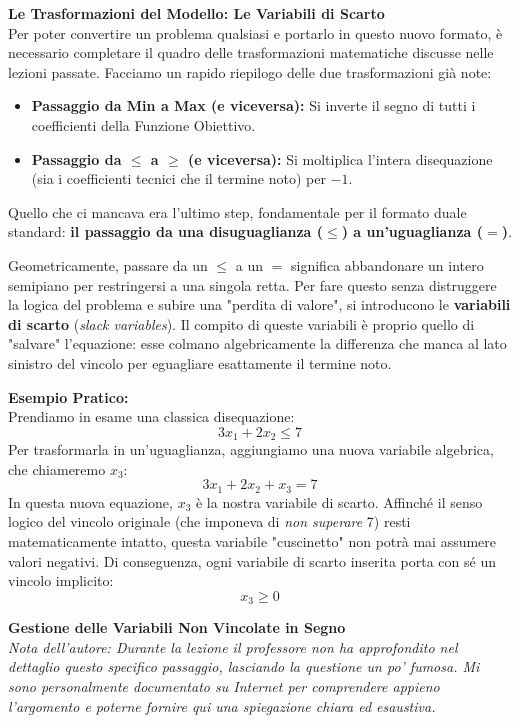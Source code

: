\documentclass[12pt, a4paper]{article}
\begin{document}
	\vspace{0.4cm}
	\textbf{Le Trasformazioni del Modello: Le Variabili di Scarto}\\
	Per poter convertire un problema qualsiasi e portarlo in questo nuovo formato, è necessario completare il quadro delle trasformazioni matematiche discusse nelle lezioni passate. Facciamo un rapido riepilogo delle due trasformazioni già note:
	\begin{itemize}[label=\textcolor{titlecolor}{\Large\textbullet}, itemsep=4pt, leftmargin=1.5cm]
		\item \textbf{Passaggio da Min a Max (e viceversa):} Si inverte il segno di tutti i coefficienti della Funzione Obiettivo.
		\item \textbf{Passaggio da $\leq$ a $\geq$ (e viceversa):} Si moltiplica l'intera disequazione (sia i coefficienti tecnici che il termine noto) per $-1$.
	\end{itemize}
	
	Quello che ci mancava era l'ultimo step, fondamentale per il formato duale standard: \textbf{il passaggio da una disuguaglianza ($\leq$) a un'uguaglianza ($=$)}. 
	
	Geometricamente, passare da un $\leq$ a un $=$ significa abbandonare un intero semipiano per restringersi a una singola retta. Per fare questo senza distruggere la logica del problema e subire una "perdita di valore", si introducono le \textbf{variabili di scarto} (\textit{slack variables}). Il compito di queste variabili è proprio quello di "salvare" l'equazione: esse colmano algebricamente la differenza che manca al lato sinistro del vincolo per eguagliare esattamente il termine noto.
	
	\textbf{Esempio Pratico:}\\
	Prendiamo in esame una classica disequazione:
	\[
	3x_1 + 2x_2 \leq 7
	\]
	Per trasformarla in un'uguaglianza, aggiungiamo una nuova variabile algebrica, che chiameremo $x_3$:
	\[
	3x_1 + 2x_2 + x_3 = 7
	\]
	In questa nuova equazione, $x_3$ è la nostra variabile di scarto. Affinché il senso logico del vincolo originale (che imponeva di \textit{non superare} 7) resti matematicamente intatto, questa variabile "cuscinetto" non potrà mai assumere valori negativi. Di conseguenza, ogni variabile di scarto inserita porta con sé un vincolo implicito:
	\[
	x_3 \geq 0
	\]
	
	\vspace{0.6cm}
	\textbf{Gestione delle Variabili Non Vincolate in Segno}\\
	\textit{\small Nota dell'autore: Durante la lezione il professore non ha approfondito nel dettaglio questo specifico passaggio, lasciando la questione un po' fumosa. Mi sono personalmente documentato su Internet per comprendere appieno l'argomento e poterne fornire qui una spiegazione chiara ed esaustiva.}
	
\end{document}
